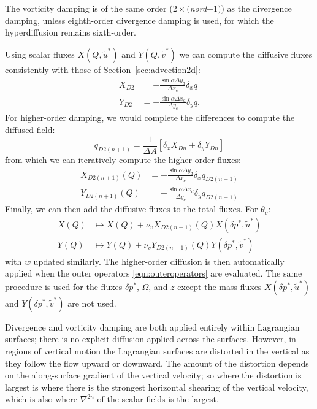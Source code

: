 \documentclass[10pt,letterpaper,margin=1in]{memoir}
\begin{document}
The vorticity damping is of the same order ($2\times($\textit{nord}$+1)$) as the divergence damping, unless eighth-order divergence damping is used, for which the hyperdiffusion remains sixth-order. 

Using scalar fluxes $X(Q,\widetilde{u}^*)$ and $Y(Q,\widetilde{v}^*)$ we can compute the diffusive fluxes consistently with those of Section~\ref{sec:advection2d}:
\begin{equation}
\begin{split}
X_{D2} &= - \frac{\sin \alpha \Delta y_d}{\Delta x_c} \delta_x q \\
Y_{D2} &= - \frac{\sin \alpha \Delta x_d}{\Delta y_c} \delta_y q.
\end{split}
\end{equation}
For higher-order damping, we would complete the differences to compute the diffused field:
\begin{equation}
q_{D2(n+1)} = \frac{1}{\Delta A} \left [ \delta_x X_{Dn} + \delta_y Y_{Dn} \right ]
\end{equation}
from which we can iteratively compute the higher order fluxes:
\begin{equation}
\begin{split}
X_{D2(n+1)}(Q) &= - \frac{\sin \alpha \Delta y_d}{\Delta x_c} \delta_x q_{D2(n+1)} \\
Y_{D2(n+1)}(Q) &= - \frac{\sin \alpha \Delta x_d}{\Delta y_c} \delta_y q_{D2(n+1)} 
\end{split}
\end{equation}
Finally, we can then add the diffusive fluxes to the total fluxes. For $\theta_v$:
\begin{equation} \label{eqn:vortdamp}
\begin{split}
X(Q) & \mapsto X(Q) + \nu_v X_{D2(n+1)}(Q) X(\delta p^*,\widetilde{u}^*) \\
Y(Q) & \mapsto Y(Q) + \nu_v Y_{D2(n+1)}(Q) Y(\delta p^*,\widetilde{v}^*) 
\end{split}
\end{equation}
with $w$ updated similarly. The higher-order diffusion is then automatically applied when the outer operators \eqref{eqn:outeroperators} are evaluated. The same procedure is used for the fluxes $\delta p^*$, $\Omega$, and $z$ except the mass fluxes $X(\delta p^*,\widetilde{u}^*)$ and $Y(\delta p^*,\widetilde{v}^*) $ are not used.

Divergence and vorticity damping are both applied entirely within Lagrangian surfaces; there is no explicit diffusion applied across the surfaces. However, in regions of vertical motion the Lagrangian surfaces are distorted in the vertical as they follow the flow upward or downward. The amount of the distortion depends on the along-surface gradient of the vertical velocity; so where the distortion is largest is where there is the strongest horizontal shearing of the vertical velocity, which is also where $\nabla^{2n}$ of the scalar fields is the largest. 
\end{document}
